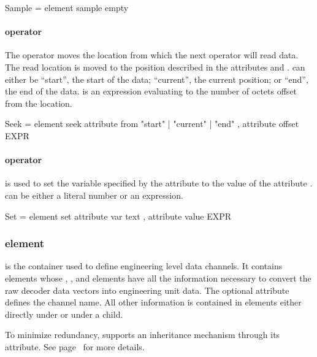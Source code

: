 \documentclass{article}
\begin{document}
\begin{grammar}
Sample = element sample { empty }
\end{grammar}

\paragraph{ operator}

The  operator moves the location from which the next
 operator will read data.  The read location is moved to the
position described in the attributes  and .
 can either be ``start'', the start of the data;
``current'', the current position; or ``end'', the end of the data.
 is an expression evaluating to the number of octets
offset from the  location.

\begin{grammar}
Seek = element seek {
  attribute from { "start" | "current" | "end" },
  attribute offset { EXPR }
}
\end{grammar}

\paragraph{ operator}

 is used to set the variable specified by the attribute
 to the value of the attribute .   can
be either a literal number or an expression.

\begin{grammar}
Set = element set {
  attribute var { text },
  attribute value { EXPR }
}
\end{grammar}

\subsubsection{ element}

 is the container used to define engineering level data
channels.  It contains  elements whose
, , and  elements have all the
information necessary to convert the raw decoder data vectors into
engineering unit data.  The optional  attribute defines the
channel name.  All other information is contained in 
elements either directly under  or under a 
child.

To minimize redundancy,  supports an inheritance mechanism
through its  attribute.  See page~\pageref{inherit} for more
details.
\end{document}
